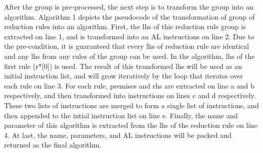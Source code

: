 After the group is pre-processed, the next step is to transform the group into
an algorithm. Algorithm 1 depicts the pseudocode of the transformation of group
of reduction rules into an algorithm.  First, the lhs of this reduction rule
group is extracted on line 1, and is transformed into an AL instructions on
line 2. Due to the pre-condition, it is guaranteed that every lhs of reduction
rule are identical and any lhs from any rules of the group can be used. In the
algorithm, lhs of the first rule (r*[0]) is used. The result of this
transformed lhs will be used as an initial instruction list, and will grow
iteratively by the loop that iterates over each rule on line 3.  For each rule,
premises and rhs are extracted on line a and b respectively, and then
transformed into instructions on lines c and d respectively. These two lists of
instructions are merged to form a single list of instructions, and then
appended to the intial instruction list on line e.  Finally, the name and
parameter of this algorithm is extracted from the lhs of the reduction rule on
line 4. At last, the name, parameters, and AL instructions will be packed and
returned as the final algorithm.

